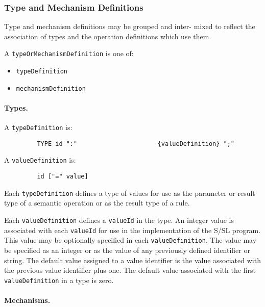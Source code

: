 \subsubsection{Type and Mechanism Definitions}

Type and mechanism definitions may be grouped and  inter-
mixed  to reflect the association of types and the operation
definitions which use them.

A {\tt typeOrMechanismDefinition} is one of:
\begin{itemize}
\item {\tt typeDefinition}
\item {\tt mechanismDefinition}
\end{itemize}





\paragraph{Types.}

A {\tt typeDefinition} is:
\begin{tscreen}
\begin{verbatim}
         TYPE id ":"                      {valueDefinition} ";"
\end{verbatim}
\end{tscreen}


A {\tt valueDefinition} is:
\begin{tscreen}
\begin{verbatim}
         id ["=" value]
\end{verbatim}
\end{tscreen}


Each {\tt typeDefinition} defines a type of values for  use  as
the  parameter  or result type of a semantic operation or as
the result type of a rule.

Each {\tt valueDefinition} defines a {\tt valueId} in the  type. An
integer value is associated with each {\tt valueId} for use in the
implementation of the  S/SL  program.   This  value  may  be
optionally specified in each {\tt valueDefinition}.  The value may
be specified as an integer or as the value of any previously
defined identifier or string.  The default value assigned to
a value identifier is the value associated with the previous
value  identifier  plus  one.   The default value associated
with the first {\tt valueDefinition} in a type is zero.




\paragraph{Mechanisms.}

